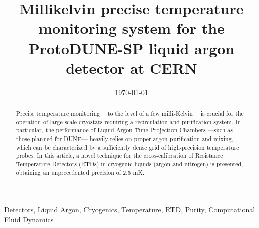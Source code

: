 \documentclass[review,1p,number,sort&compress]{elsarticle}
\begin{document}
\title{Millikelvin precise temperature monitoring system for the ProtoDUNE-SP liquid argon detector at CERN}


\date{\today}

\begin{abstract}
Precise temperature monitoring  ---to the level of a few milli-Kelvin--- is crucial for the operation of large-scale cryostats requiring a recirculation and purification system. In particular, the performance of Liquid Argon Time Projection Chambers ---such as those planned for DUNE--- heavily relies on proper argon purification and mixing, which can be characterized by a sufficiently dense grid of high-precision temperature probes. In this article, a novel technique for the cross-calibration of Resistance Temperature Detectors (RTDs) in cryogenic liquids (argon and nitrogen) is presented, obtaining an unprecedented precision of 2.5 mK.
\end{abstract}

\begin{keyword}
Detectors, Liquid Argon, Cryogenics, Temperature, RTD, Purity, Computational Fluid Dynamics
\end{keyword}

\maketitle











\end{document}
